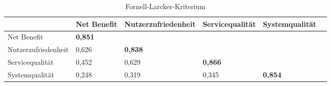 \begin{table}[h] 
\footnotesize
\caption{Fornell-Larcker-Kriterium}
\label{tab:Fornell-Larcker-Kriterium} 
\begin{tabular}{@{}llllll@{}} \toprule

 & \textbf{Net Benefit} & \textbf{Nutzerzufriedenheit} & \textbf{Servicequalität} & \textbf{Systemqualität} \\ \midrule

 Net Benefit 			& \textbf{0,851}		& 			& 		&  		\\
 
 Nutzerzufriedenheit 	& 0,626 		& \textbf{0,838}		& 		& 			\\

 Servicequalität 		& 0,452 		& 0,629 		& \textbf{0,866}	& 		 \\

 Systemqualität 		& 0,248 		& 0,319 		& 0,345 	& \textbf{0,854} \\ 
 
 \bottomrule
\end{tabular}	
\end{table}


